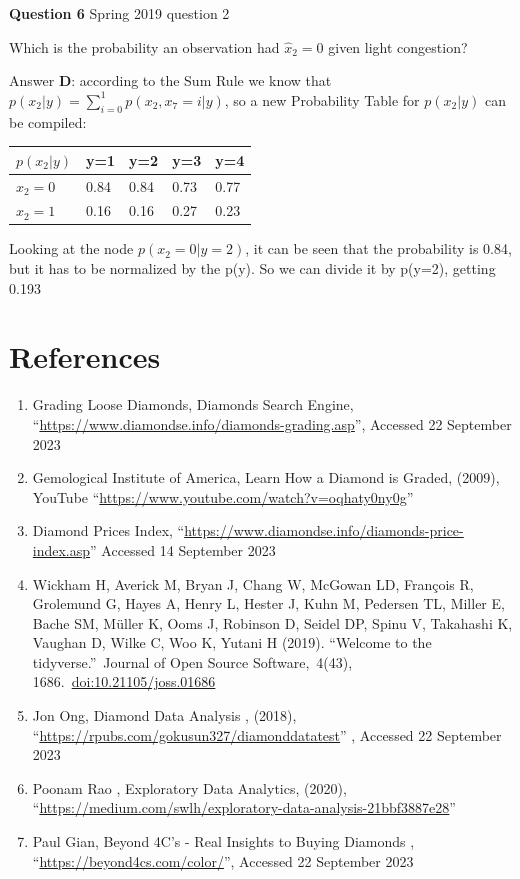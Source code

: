 \documentclass[
]{article}
\begin{document}
\textbf{Question 6} \textbar{} Spring 2019 question 2

Which is the probability an observation had \(\hat{x}_2=0\) given light
congestion?

Answer \textbf{D}: according to the Sum Rule we know that
\(p(x_2|y)= \sum_{i=0}^{1} p(x_2,x_7=i|y)\), so a new Probability Table
for \(p(x_2|y)\) can be compiled:

\begin{longtable}[]{@{}lllll@{}}
\toprule\noalign{}
\(p(x_2 |y)\) & y=1 & y=2 & y=3 & y=4 \\
\midrule\noalign{}
\endhead
\bottomrule\noalign{}
\endlastfoot
\(x_2=0\) & 0.84 & 0.84 & 0.73 & 0.77 \\
\(x_2=1\) & 0.16 & 0.16 & 0.27 & 0.23 \\
\end{longtable}

Looking at the node \(p(x_2=0|y=2)\), it can be seen that the
probability is 0.84, but it has to be normalized by the p(y). So we can
divide it by p(y=2), getting 0.193

\newpage

\section{References}\label{references}

\begin{enumerate}
\def\labelenumi{\arabic{enumi})}
\item
  Grading Loose Diamonds, Diamonds Search Engine,
  ``\url{https://www.diamondse.info/diamonds-grading.asp}'', Accessed 22
  September 2023
\item
  Gemological Institute of America, Learn How a Diamond is Graded,
  (2009), YouTube ``\url{https://www.youtube.com/watch?v=oqhaty0ny0g}''
\item
  Diamond Prices Index,
  ``\url{https://www.diamondse.info/diamonds-price-index.asp}'' Accessed
  14 September 2023
\item
  Wickham H, Averick M, Bryan J, Chang W, McGowan LD, François R,
  Grolemund G, Hayes A, Henry L, Hester J, Kuhn M, Pedersen TL, Miller
  E, Bache SM, Müller K, Ooms J, Robinson D, Seidel DP, Spinu V,
  Takahashi K, Vaughan D, Wilke C, Woo K, Yutani H (2019). ``Welcome to
  the tidyverse.''~Journal of Open Source Software,~4(43),
  1686.~\url{doi:10.21105/joss.01686}
\item
  Jon Ong, Diamond Data Analysis , (2018),
  ``\url{https://rpubs.com/gokusun327/diamonddatatest}'' , Accessed 22
  September 2023
\item
  Poonam Rao , Exploratory Data Analytics, (2020),
  ``\url{https://medium.com/swlh/exploratory-data-analysis-21bbf3887e28}''
\item
  Paul Gian, Beyond 4C's - Real Insights to Buying Diamonds ,
  ``\url{https://beyond4cs.com/color/}'', Accessed 22 September 2023
\end{enumerate}
\end{document}
